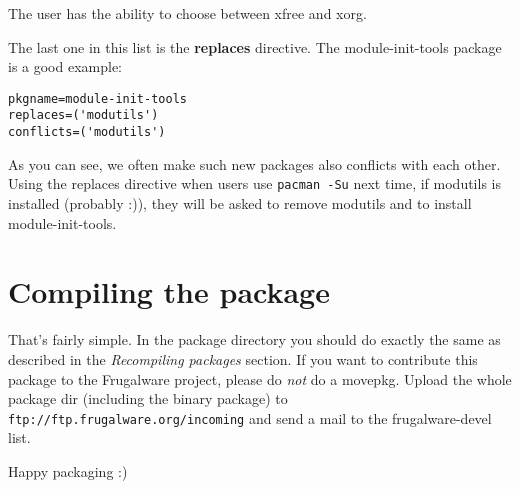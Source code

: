 The user has the ability to choose between xfree and xorg.

The last one in this list is the \textbf{replaces} directive. The module-init-tools package is a good example:
\begin{verbatim}
pkgname=module-init-tools
replaces=('modutils')
conflicts=('modutils')
\end{verbatim}

As you can see, we often make such new packages also conflicts with each other. Using the replaces directive when users use {\tt pacman -Su} next time, if modutils is installed (probably :)), they will be asked to remove modutils and to install module-init-tools.

\section{Compiling the package}

That's fairly simple. In the package directory you should do exactly the same as described in the \textit{Recompiling packages} section. If you want to contribute this package to the Frugalware project, please do \textit{not} do a movepkg. Upload the whole package dir (including the binary package) to {\tt ftp://ftp.frugalware.org/incoming} and send a mail to the frugalware-devel list.

Happy packaging :)